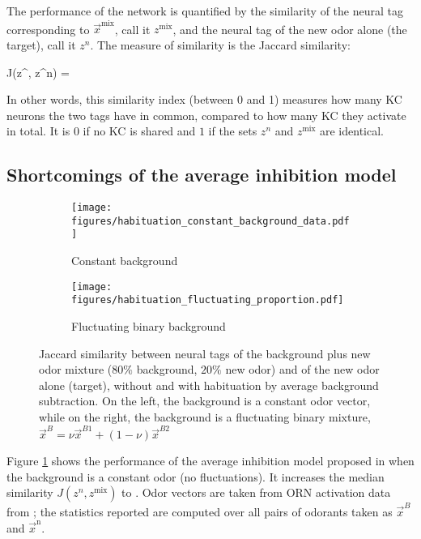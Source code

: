 The performance of the network is quantified by the similarity of the neural tag corresponding to $\vec{x}^{\mathrm{mix}}$, call it $z^{\mathrm{mix}}$, and the neural tag of the new odor alone (the target), call it $z^n$. The measure of similarity is the Jaccard similarity:

\beq
	J(z^{}, z^n) = 
	\label{eq:jaccard_def}
\eeq

In other words, this similarity index (between 0 and 1) measures how many KC neurons the two tags have in common, compared to how many KC they activate in total. It is $0$ if no KC is shared and $1$ if the sets $z^n$ and $z^{\mathrm{mix}}$ are identical. 


\subsection{Shortcomings of the average inhibition model}
\label{subsect:shortcomings}

\begin{figure}
  \begin{subfigure}[b]{.49\textwidth}
	\centering
	\texttt{[image: figures/habituation\_constant\_background\_data.pdf]}
	\caption{Constant background}
	\label{fig:jaccard_constant_background}
  \end{subfigure}\hfill
  \begin{subfigure}[b]{.49\textwidth}
	\centering
	\texttt{[image: figures/habituation\_fluctuating\_proportion.pdf]}
	\caption{Fluctuating binary background}
	\label{fig:jaccard_binary_background}
  \end{subfigure}
\caption{Jaccard similarity between neural tags of the background plus new odor mixture ($80 \%$ background, $20 \%$ new odor) and of the new odor alone (target), without and with habituation by average background subtraction. On the left, the background is a constant odor vector, while on the right, the background is a fluctuating binary mixture, $\vec{x}^B = \nu \vec{x}^{B1} + (1 - \nu) \vec{x}^{B2}$}
\label{fig:jaccard_average_inhibition}
\end{figure}

Figure \ref{fig:jaccard_constant_background} shows the performance of the average inhibition model proposed in \cite{shen_habituation_2020} when the background is a constant odor (no fluctuations). It increases the median similarity $J(z^n, z^{\mathrm{mix}})$ to . Odor vectors are taken from ORN activation data from \cite{hallem_coding_2006}; the statistics reported are computed over all pairs of odorants taken as $\vec{x}^B$ and $\vec{x}^{\mathrm{n}}$. 


